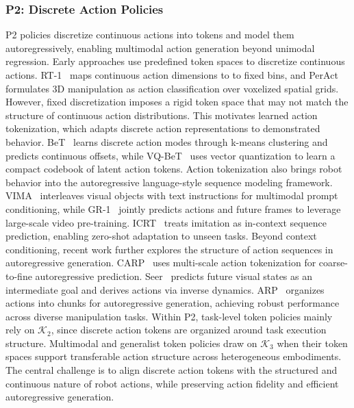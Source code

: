 \documentclass[acmsmall,screen,review]{acmart}
\begin{document}
\subsubsection{P2: Discrete Action Policies}\label{sec:discrete_action_policies}

P2 policies discretize continuous actions into tokens and model them autoregressively, enabling multimodal action generation beyond unimodal regression.
Early approaches use predefined token spaces to discretize continuous actions.
RT-1~\cite{brohan2023rt1} maps continuous action dimensions to to fixed bins, 
and PerAct~\cite{shridhar2022peract} formulates 3D manipulation as action classification over voxelized spatial grids.
However, fixed discretization imposes a rigid token space that may not match the structure of continuous action distributions.
This motivates learned action tokenization, which adapts discrete action representations to demonstrated behavior. 
BeT~\cite{shafiullah2022bet} learns discrete action modes through k-means clustering and predicts continuous offsets, 
while VQ-BeT~\cite{lee2024vqbet} uses vector quantization to learn a compact codebook of latent action tokens.
Action tokenization also brings robot behavior into the autoregressive language-style sequence modeling framework.
VIMA~\cite{jiang2023vima} interleaves visual objects with text instructions for multimodal prompt conditioning, 
while GR-1~\cite{wu2023gr1} jointly predicts actions and future frames to leverage large-scale video pre-training. 
ICRT~\cite{fu2025icil} treats imitation as in-context sequence prediction, enabling zero-shot adaptation to unseen tasks.
Beyond context conditioning, recent work further explores the structure of action sequences in autoregressive generation.
CARP~\cite{gong2025carp} uses multi-scale action tokenization for coarse-to-fine autoregressive prediction. 
Seer~\cite{tian2024seer} predicts future visual states as an intermediate goal and derives actions via inverse dynamics. 
ARP~\cite{zhang2025arp} organizes actions into chunks for autoregressive generation, achieving robust performance across diverse manipulation tasks.
Within P2, task-level token policies mainly rely on \(\mathcal{K}_2\), since discrete action tokens are organized around task execution structure.
Multimodal and generalist token policies draw on \(\mathcal{K}_3\) when their token spaces support transferable action structure across heterogeneous embodiments.
The central challenge is to align discrete action tokens with the structured and continuous nature of robot actions, while preserving action fidelity and efficient autoregressive generation.
\end{document}
